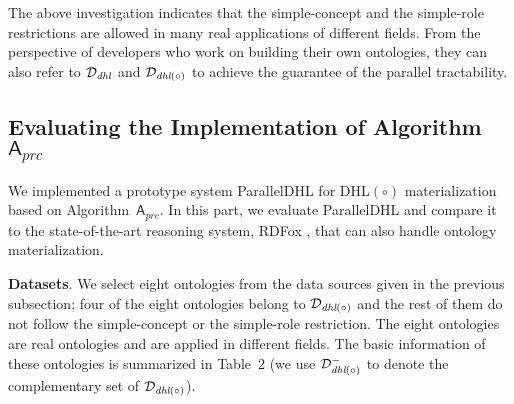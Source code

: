 \documentclass[final,1p,times]{elsarticle}
\begin{document}
The above investigation indicates that the simple-concept and the simple-role restrictions
are allowed in many real applications of different fields.
From the perspective of developers who work on building their own ontologies,
they can also refer to $\mathcal{D}_{\textit{\text{dhl}}}$ and $\mathcal{D}_{\textit{\text{dhl}}(\circ)}$
to achieve the guarantee of the parallel tractability.


\subsection{Evaluating the Implementation of Algorithm~$\mathsf{A}_{prc}$}

We implemented a prototype system ParallelDHL for DHL$(\circ)$ materialization
based on Algorithm~$\mathsf{A}_{prc}$. In this part, we evaluate ParallelDHL and
compare it to the state-of-the-art reasoning system, RDFox \cite{MotikNPHO14},
that can also handle ontology materialization.

\textbf{Datasets}.
We select eight ontologies from the data sources given in the previous subsection;
four of the eight ontologies belong to $\mathcal{D}_{\textit{\text{dhl}}(\circ)}$ and
the rest of them do not follow the simple-concept or the simple-role
restriction.
The eight ontologies are real ontologies and are applied in different fields.
The basic information of these ontologies
is summarized in Table~2 (we use $\mathcal{D}^-_{\textit{\text{dhl}}(\circ)}$
to denote the complementary set of $\mathcal{D}_{\textit{\text{dhl}}(\circ)}$).
\end{document}
